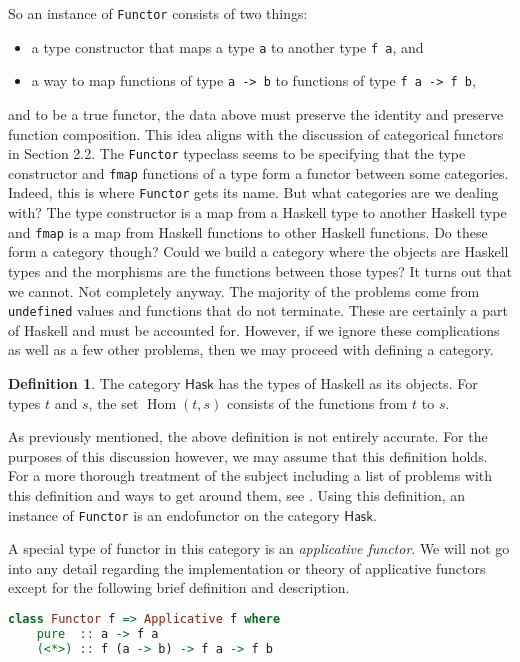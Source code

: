 \documentclass[MS, xcolor=dvipsnames]{wfuthesis}
\def\Hask{\mathsf{Hask}}
\DeclareMathOperator{\Hom}{Hom}
\theoremstyle{definition}
\newtheorem{definition}[theorem]{Definition}
\begin{document}
So an instance of \lstinline{Functor} consists of two things:
\begin{itemize}
  \item a type constructor that maps a type \lstinline{a} to another type \lstinline{f a}, and
  \item a way to map functions of type \lstinline{a -> b} to functions of type \lstinline{f a -> f b},
\end{itemize}
and to be a true functor, the data above must preserve the identity and preserve function composition. This idea aligns with the discussion of categorical functors in Section 2.2. The \lstinline{Functor} typeclass seems to be specifying that the type constructor and \lstinline{fmap} functions of a type form a functor between some categories. Indeed, this is where \lstinline{Functor} gets its name. But what categories are we dealing with? The type constructor is a map from a Haskell type to another Haskell type and \lstinline{fmap} is a map from Haskell functions to other Haskell functions. Do these form a category though? Could we build a category where the objects are Haskell types and the morphisms are the functions between those types? It turns out that we cannot. Not completely anyway. The majority of the problems come from \lstinline{undefined} values and functions that do not terminate. These are certainly a part of Haskell and must be accounted for. However, if we ignore these complications as well as a few other problems, then we may proceed with defining a category.
\begin{definition}
  The category $\Hask$ has the types of Haskell as its objects. For types $t$ and $s$, the set $\Hom(t,s)$ consists of the functions from $t$ to $s$.
\end{definition}
As previously mentioned, the above definition is not entirely accurate. For the purposes of this discussion however, we may assume that this definition holds. For a more thorough treatment of the subject including a list of problems with this definition and ways to get around them, see \cite{Milewski2019}. Using this definition, an instance of \lstinline{Functor} is an endofunctor on the category $\Hask$. \par
A special type of functor in this category is an \emph{applicative functor}. We will not go into any detail regarding the implementation or theory of applicative functors except for the following brief definition and description.
\begin{lstlisting}[language=Haskell]
class Functor f => Applicative f where
    pure  :: a -> f a
    (<*>) :: f (a -> b) -> f a -> f b
\end{lstlisting}
\end{document}
